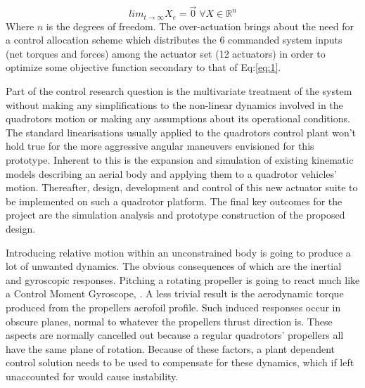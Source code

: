 \begin{equation} \label{eq:1}
lim_{t \rightarrow \infty} X_e = \vec{0}\;\forall X \in \mathbb{R}^n
\end{equation}
Where $n$ is the degrees of freedom. The over-actuation brings about the need for a control allocation scheme which distributes the 6 commanded system inputs (net torques and forces) among the actuator set (12 actuators) in order to optimize some objective function secondary to that of Eq:\ref{eq:1}.
\par
Part of the control research question is the multivariate treatment of the system without making any simplifications to the non-linear dynamics involved in the quadrotors motion or making any assumptions about its operational conditions. The standard linearisations usually applied to the quadrotors control plant won't hold true for the more aggressive angular maneuvers envisioned for this prototype. Inherent to this is the expansion and simulation of existing kinematic models describing an aerial body and applying them to a quadrotor vehicles' motion. Thereafter, design, development and control of this new actuator suite to be implemented on such a quadrotor platform. The final key outcomes for the project are the simulation analysis and prototype construction of the proposed design.
\par
Introducing relative motion within an unconstrained body is going to produce a lot of unwanted dynamics. The obvious consequences of which are the inertial and gyroscopic responses. Pitching a rotating propeller is going to react much like a Control Moment Gyroscope, \cite{cmg}. A less trivial result is the aerodynamic torque produced from the propellers aerofoil profile. Such induced responses occur in obscure planes, normal to whatever the propellers thrust direction is. These aspects are normally cancelled out because a regular quadrotors' propellers all have the same plane of rotation. Because of these factors, a plant dependent control solution needs to be used to compensate for these dynamics, which if left unaccounted for would cause instability. 
